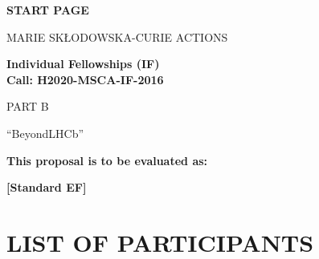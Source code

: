 \documentclass[a4paper,11pt]{article}
\newcommand{\acronym}{{\sc BeyondLHCb}\xspace} %
\begin{document}
\phantom{a}
\vspace{15mm}
\begin{center}
        \Large{
     
        \textbf{START PAGE}
  
          \vspace{15mm}
          MARIE SKŁODOWSKA-CURIE ACTIONS\\
          \vspace{1cm}
          
          \textbf{Individual Fellowships (IF)}\\
          \textbf{Call: H2020-MSCA-IF-2016}
          \vspace{2cm}                   

          PART B
          \vspace{2.5cm}

          ``\acronym''
          \vspace{2cm}

          \textbf{This proposal is to be evaluated as:}
          \vspace{.5cm}

          \textbf{[Standard EF]}
        }
\end{center}
\vspace{1cm}

\newpage
\renewcommand{\contentsname}{TABLE OF CONTENTS}
\setcounter{tocdepth}{2}
\tableofcontents




\newpage
\section*{LIST OF PARTICIPANTS}
\label{sec:participants}

\newcommand\rotx[1]{\rotatebox[origin=c]{90}{\textbf{#1}}}
\newcommand\roty[1]{\rotatebox[origin=c]{90}{\parbox{4cm}{\raggedright\textbf{#1}}}}
\newcommand\MyHead[2]{\multicolumn{1}{l|}{\parbox{#1}{\centering #2}}}
\end{document}
